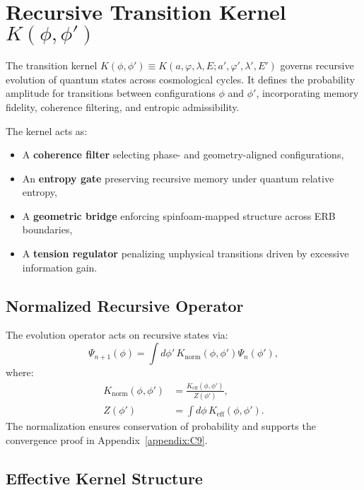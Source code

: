 \section{Recursive Transition Kernel \( K(\phi,\phi') \)}
\label{sec:kernel}

The transition kernel \( K(\phi,\phi') \equiv K(a,\varphi,\lambda,E; a',\varphi',\lambda',E') \) governs recursive evolution of quantum states across cosmological cycles. It defines the probability amplitude for transitions between configurations \( \phi \) and \( \phi' \), incorporating memory fidelity, coherence filtering, and entropic admissibility.

The kernel acts as:
\begin{itemize}
    \item A \textbf{coherence filter} selecting phase- and geometry-aligned configurations,
    \item An \textbf{entropy gate} preserving recursive memory under quantum relative entropy,
    \item A \textbf{geometric bridge} enforcing spinfoam-mapped structure across ERB boundaries,
    \item A \textbf{tension regulator} penalizing unphysical transitions driven by excessive information gain.
\end{itemize}

\subsection{Normalized Recursive Operator}
\label{subsec:normalized-kernel}

The evolution operator acts on recursive states via:
\begin{equation}
\Psi_{n+1}(\phi) = \int d\phi' \, K_{\text{norm}}(\phi, \phi') \Psi_n(\phi'),
\end{equation}
where:
\begin{align}
K_{\text{norm}}(\phi, \phi') &= \frac{K_{\text{eff}}(\phi, \phi')}{Z(\phi')}, \\
Z(\phi') &= \int d\phi \, K_{\text{eff}}(\phi, \phi').
\end{align}
The normalization ensures conservation of probability and supports the convergence proof in Appendix~\ref{appendix:C9}.

\subsection{Effective Kernel Structure}
\label{subsec:effective-kernel}

